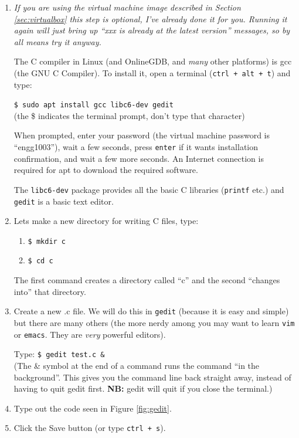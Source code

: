 \documentclass{lab}
\begin{document}
\begin{enumerate}
\item \textit{If you are using the virtual machine image described in Section \ref{sec:virtualbox} this step is optional, I've already done it for you. Running it again will just bring up ``xxx is already at the latest version'' messages, so by all means try it anyway.}

The C compiler in Linux (and OnlineGDB, and \textit{many} other platforms) is gcc (the GNU C Compiler). To install it, open a terminal (\texttt{ctrl + alt + t}) and type:

\texttt{\$ sudo apt install gcc libc6-dev gedit}\\ (the \$ indicates the terminal prompt, don't type that character)

When prompted, enter your password (the virtual machine password is ``engg1003''), wait a few seconds, press \texttt{enter} if it wants installation confirmation, and wait a few more seconds. An Internet connection is required for apt to download the required software.

The \texttt{libc6-dev} package provides all the basic C libraries (\texttt{printf} etc.) and \texttt{gedit} is a basic text editor.

\item Lets make a new directory for writing C files, type:
\begin{enumerate}
	\item \texttt{\$ mkdir c}
	\item \texttt{\$ cd c}
\end{enumerate}
The first command creates a directory called ``c'' and the second ``changes into'' that directory.

\item Create a new .c file. We will do this in \texttt{gedit} (because it is easy and simple) but there are many others (the more nerdy among you may want to learn \texttt{vim} or \texttt{emacs}. They are \textit{very} powerful editors).

Type: \texttt{\$ gedit test.c \&} \\ (The \& symbol at the end of a command runs the command ``in the background''. This gives you the command line back straight away, instead of having to quit gedit first. \textbf{NB:} gedit will quit if you close the terminal.)

\item Type out the code seen in Figure \ref{fig:gedit}.

\item Click the Save button (or type \texttt{ctrl + s}).


\end{enumerate}
\end{document}

